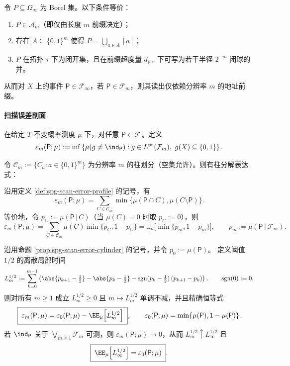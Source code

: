 \begin{proposition}[可判定性与闭开性]\label{prop:spg-decidable-clopen}
令 $P\subseteq\Omega_\infty$ 为 Borel 集。以下条件等价：
\begin{enumerate}
  \item $P\in\mathcal{A}_m$（即仅由长度 $m$ 前缀决定）；
  \item 存在 $A\subseteq\{0,1\}^m$ 使得 $P=\bigcup_{a\in A}[a]$；
  \item $P$ 在拓扑 $\tau$ 下为闭开集，且在前缀超度量 $d_{\mathrm{pre}}$ 下可写为若干半径 $2^{-m}$ 闭球的并。
\end{enumerate}
从而对 $X$ 上的事件 $\mathsf P\in\mathcal{F}_\infty$，若 $\mathsf P\in\mathcal{F}_m$，则其读出仅依赖分辨率 $m$ 的地址前缀。
\end{proposition}

\paragraph{扫描误差剖面}
\begin{definition}[扫描误差剖面]\label{def:spg-scan-error-profile}
在给定 $T$-不变概率测度 $\mu$ 下，对任意 $\mathsf P\in\mathcal{F}_\infty$ 定义
\[
\varepsilon_m(\mathsf P;\mu)
:=\inf\left\{\mu(g\neq \ind_{\mathsf P}): g\in L^\infty(\mathcal{F}_m),\ g(X)\subseteq\{0,1\}\right\}.
\]
\end{definition}

令 $\mathcal{C}_m:=\{C_a:a\in\{0,1\}^m\}$ 为分辨率 $m$ 的柱划分（空集允许）。则有柱分解表达式：

\begin{proposition}[柱分解的精确表达]\label{prop:spg-scan-error-cylinder}
沿用定义 \ref{def:spg-scan-error-profile} 的记号，有
\[
\varepsilon_m(\mathsf P;\mu)
=\sum_{C\in\mathcal{C}_m}\min\{\mu(\mathsf P\cap C),\mu(C\setminus \mathsf P)\}.
\]
等价地，令 $p_C:=\mu(\mathsf P\,|\,C)$（当 $\mu(C)=0$ 时取 $p_C:=0$），则
\[
\varepsilon_m(\mathsf P;\mu)
=\sum_{C\in\mathcal{C}_m}\mu(C)\min\{p_C,1-p_C\}
=\mathbb{E}_\mu\bigl[\min\{p_m,1-p_m\}\bigr],
\qquad
p_m:=\mu(\mathsf P\,|\,\mathcal{F}_m).
\]
\end{proposition}



\begin{theorem}\label{thm:spg-scan-tanaka-stokes}
沿用命题 \ref{prop:spg-scan-error-cylinder} 的记号，并令 \(p_0:=\mu(\mathsf P)\)。
定义阈值 \(1/2\) 的离散局部时间
\[
L_m^{1/2}
:=\sum_{k=0}^{m-1}\left(
\abs{p_{k+1}-\tfrac12}-\abs{p_k-\tfrac12}-\operatorname{sgn}(p_k-\tfrac12)\,(p_{k+1}-p_k)
\right),
\qquad
\operatorname{sgn}(0):=0.
\]
则对所有 \(m\ge 1\) 成立 \(L_m^{1/2}\ge 0\) 且 \(m\mapsto L_m^{1/2}\) 单调不减，并且精确恒等式
\[
\boxed{\;
\varepsilon_m(\mathsf P;\mu)=\varepsilon_0(\mathsf P;\mu)-\EE_\mu\!\left[L_m^{1/2}\right]\; },
\qquad
\varepsilon_0(\mathsf P;\mu)=\min\{\mu(\mathsf P),1-\mu(\mathsf P)\}.
\]
若 \(\ind_{\mathsf P}\) 关于 \(\bigvee_{m\ge 1}\mathcal F_m\) 可测，则 \(\varepsilon_m(\mathsf P;\mu)\to 0\)，从而 \(L_m^{1/2}\uparrow L_\infty^{1/2}\) 且
\[
\boxed{\;
\EE_\mu\!\left[L_\infty^{1/2}\right]=\varepsilon_0(\mathsf P;\mu)\; }.
\]
\end{theorem}


